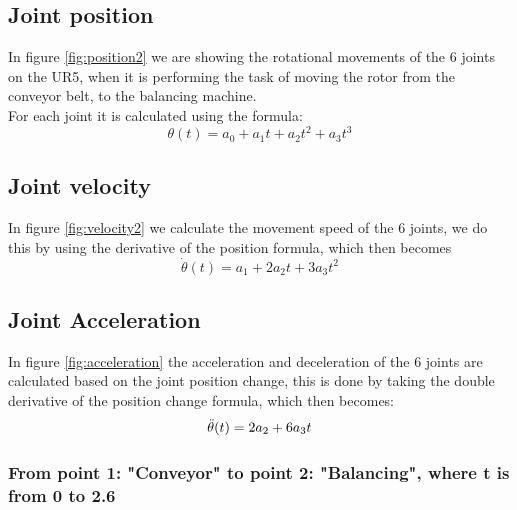 \subsection{Joint position}
In figure \ref{fig:position2} we are showing the rotational movements of the 6 joints on the UR5, when it is performing the task of moving the rotor from the conveyor belt, to the balancing machine.\\
For each joint it is calculated using the formula: 
\begin{equation}
  \theta(t)=a_0+a_1t+a_2t^2+a_3t^3
\end{equation}

\subsection{Joint velocity}
In figure \ref{fig:velocity2} we calculate the movement speed of the 6 joints, we do this by using the derivative of the position formula, which then becomes
\begin{equation}
\Dot{\theta}(t)=a_1+2a_2t+3a_3t^2
\end{equation}

\subsection{Joint Acceleration}
In figure \ref{fig:acceleration} the acceleration and deceleration of the 6 joints are calculated based on the joint position change, this is done by taking the double derivative of the position change formula, which then becomes:
\begin{equation}
\Ddot{\theta}(t)=2a_2+6a_3t
\end{equation}

\subsubsection{From point 1: "Conveyor" to point 2: "Balancing", where t is from 0 to 2.6}

